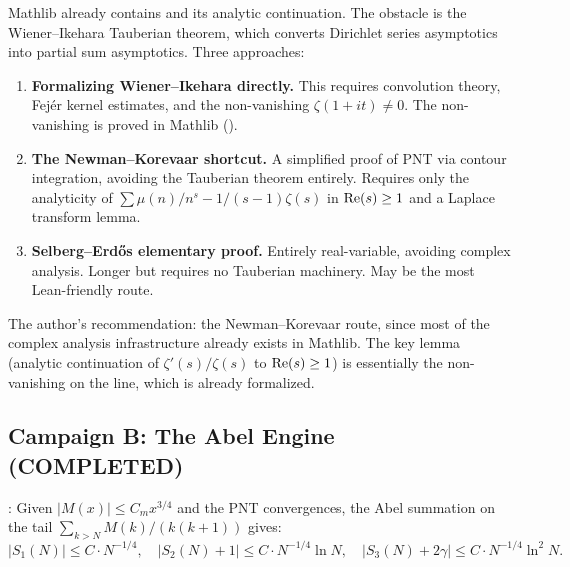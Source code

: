 \documentclass[11pt,a4paper]{article}
\begin{document}
\begin{direction}
Mathlib already contains  and its analytic continuation.
The obstacle is the Wiener--Ikehara Tauberian theorem, which converts
Dirichlet series asymptotics into partial sum asymptotics. Three approaches:

\begin{enumerate}
  \item \textbf{Formalizing Wiener--Ikehara directly.} This requires
    convolution theory, Fej\'er kernel estimates, and the non-vanishing
    $\zeta(1+it) \neq 0$. The non-vanishing is proved in Mathlib
    ().

  \item \textbf{The Newman--Korevaar shortcut.} A simplified proof of
    PNT via contour integration, avoiding the Tauberian theorem entirely.
    Requires only the analyticity of $\sum \mu(n)/n^s - 1/(s-1)\zeta(s)$
    in $\operatorname{Re}(s) \geq 1$ and a Laplace transform lemma.

  \item \textbf{Selberg--Erd\H{o}s elementary proof.} Entirely real-variable,
    avoiding complex analysis. Longer but requires no Tauberian machinery.
    May be the most Lean-friendly route.
\end{enumerate}

The author's recommendation: the Newman--Korevaar route, since most of the
complex analysis infrastructure already exists in Mathlib. The key lemma
(analytic continuation of $\zeta'(s)/\zeta(s)$ to $\operatorname{Re}(s) \geq 1$) is
essentially the non-vanishing on the line, which is already formalized.
\end{direction}

\subsection{Campaign B: The Abel Engine (COMPLETED)}
\label{sec:abel-completed}

\begin{axiombox}
: Given $|M(x)| \le C_m x^{3/4}$ and
the PNT convergences, the Abel summation on the tail
$\sum_{k > N} M(k)/(k(k+1))$ gives:
\[
  |S_1(N)| \le C \cdot N^{-1/4}, \quad
  |S_2(N)+1| \le C \cdot N^{-1/4}\ln N, \quad
  |S_3(N)+2\gamma| \le C \cdot N^{-1/4}\ln^2 N.
\]
\end{axiombox}
\end{document}
